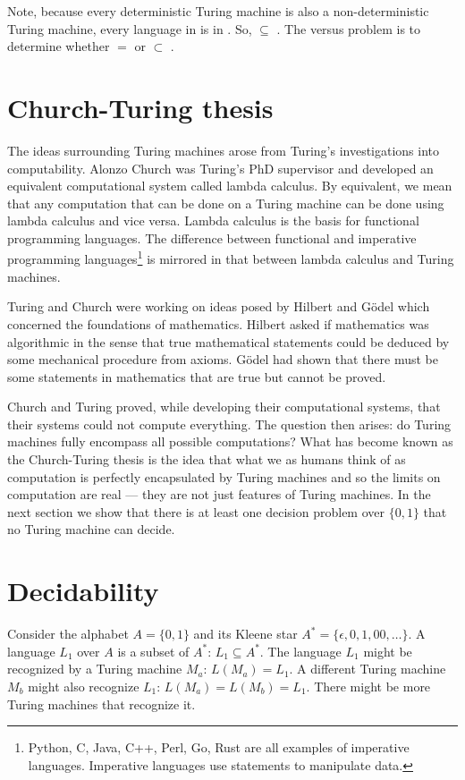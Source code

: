 \documentclass{iansnotes}
\begin{document}
  Note, because every deterministic Turing machine is also a non-deterministic Turing machine, every language in  is in .
  So,  $\subseteq$ .
  The  versus  problem is to determine whether  $=$  or  $\subset$ .


\section{Church-Turing thesis}
  The ideas surrounding Turing machines arose from Turing's investigations into computability.
  Alonzo Church was Turing's PhD supervisor and developed an equivalent computational system called lambda calculus.
  By equivalent, we mean that any computation that can be done on a Turing machine can be done using lambda calculus and vice versa.
  Lambda calculus is the basis for functional programming languages.
  The difference between functional and imperative programming languages\footnote{Python, C, Java, C++, Perl, Go, Rust are all examples of imperative languages. Imperative languages use statements to manipulate data.} is mirrored in that between lambda calculus and Turing machines.
  
  Turing and Church were working on ideas posed by Hilbert and G{\"o}del which concerned the foundations of mathematics.
  Hilbert asked if mathematics was algorithmic in the sense that true mathematical statements could be deduced by some mechanical procedure from axioms.
  G{\"o}del had shown that there must be some statements in mathematics that are true but cannot be proved.
  
  Church and Turing proved, while developing their computational systems, that their systems could not compute everything.
  The question then arises: do Turing machines fully encompass all possible computations?
  What has become known as the Church-Turing thesis is the idea that what we as humans think of as computation is perfectly encapsulated by Turing machines and so the limits on computation are real --- they are not just features of Turing machines.
  In the next section we show that there is at least one decision problem over $\{0,1\}$ that no Turing machine can decide.




\section{Decidability}
  Consider the alphabet $A = \{0,1\}$ and its Kleene star $A^* = \{\epsilon, 0, 1, 00, \ldots\}$.
  A language $L_1$ over $A$ is a subset of $A^*$: $L_1 \subseteq A^*$.
  The language $L_1$ might be recognized by a Turing machine $M_a$: $L(M_a) = L_1$.
  A different Turing machine $M_b$ might also recognize $L_1$: $L(M_a) = L(M_b) = L_1$.
  There might be more Turing machines that recognize it.
\end{document}
